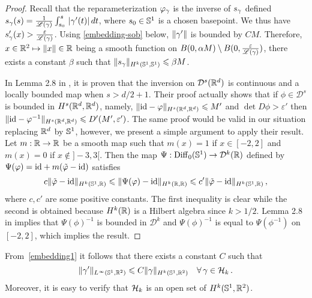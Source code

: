\begin{proof}
Recall that the reparameterization $\varphi_\gamma$ is the inverse of $s_\gamma$ defined  $s_\gamma(s) =\frac{1}{\mathscr{L}(\gamma)} \int_{s_0}^s \,|\gamma'(t)| \,dt$,
where $s_0 \in \mathbb{S}^1$ is a chosen basepoint. We thus have $s_\gamma'(x) > \frac{\varepsilon }{ \mathscr{L}(\gamma)} $.  Using \eqref{embedding-sob} below, $\| \gamma' \|$ is bounded by 
$C M$. Therefore, $x \in {\mathbb R}^2 \mapsto \| x \| \in {\mathbb R}$ being a smooth function on $B(0,\alpha M) \setminus B(0, \frac{\varepsilon }{ \mathscr{L}(\gamma)} )$, there exists a constant $\beta$ such that $\| s_\gamma \|_{H^k(\mathbb{S}^1,\mathbb{S}^1)} \leqslant \beta M$. 

 In Lemma 2.8 in \cite{Inci2013}, it is proven that the inversion on $\mathcal{D}^s({\mathbb R}^d)$ is continuous and a locally bounded map when $s>d/2 +1$. Their proof actually shows that if $\phi \in \mathcal{D}^s$ is bounded in $H^s({\mathbb R}^d,{\mathbb R}^d)$, namely, $\| \mathrm{id} - \varphi \|_{H^s({\mathbb R}^d,{\mathbb R}^d)} \leqslant M'$ and $\det D\phi > \varepsilon'$ then $\| \mathrm{id} - \varphi^{-1} \|_{H^s({\mathbb R}^d,{\mathbb R}^d)} \leqslant D'(M',\varepsilon')$.  The same proof would be valid in our situation replacing ${\mathbb R}^d$ by $\mathbb{S}^1$, however, we present a simple argument to apply their result.
Let $m:{\mathbb R} \to {\mathbb R}$ be a smooth map such that $m(x) = 1$ if $x \in [-2,2]$ and $m(x) = 0$ if $x \notin ]-3,3[$. Then the map $ \Psi:  {\rm Diff}_0(\mathbb{S}^1) \to \mathcal{D}^k({\mathbb R})$ defined by 
$\Psi(\varphi) = \mathrm{id} + m(\tilde{\varphi} - \mathrm{id})$ satisfies 
\begin{equation}
c \| \tilde{\varphi} - \mathrm{id} \|_{H^k(\mathbb{S}^1,{\mathbb R})} \leqslant \|\Psi(\varphi) - \mathrm{id}  \|_{H^k({\mathbb R},{\mathbb R})} \leqslant c' \| \tilde{\varphi} - \mathrm{id} \|_{H^k(\mathbb{S}^1,{\mathbb R})} \,,
\end{equation}
where $c,c'$ are some positive constants. The first inequality is clear while the second is obtained because $H^k({\mathbb R})$ is a Hilbert algebra since $k>1/2$.
Lemma 2.8 in \cite{Inci2013} implies that $\Psi(\phi)^{-1}$ is bounded in $\mathcal{D}^k$ and $\Psi(\phi)^{-1}$ is equal to $\Psi(\phi^{-1})$ on $[-2,2]$, which implies the result.
\end{proof}

From~\eqref{embedding1} it follows that  there exists a constant $C$ such that 
\begin{equation}\label{embedding-sob}
	\|\gamma'\|_{L^\infty(\mathbb{S}^1,{\mathbb R}^2)}\leqslant   C\|\gamma\|_{H^k(\mathbb{S}^1,\mathbb{R}^2)} \quad \forall \, \gamma \in \mathcal{H}_k \,.
\end{equation}
Moreover, it is easy to verify that $\mathcal{H}_k$ is an open set of $H^k(\mathbb{S}^1,\mathbb{R}^2)$. %

